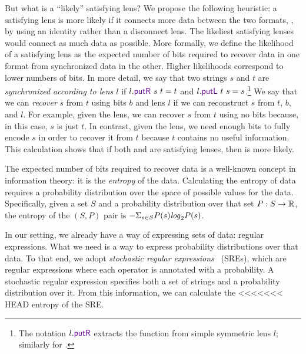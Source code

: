 \documentclass[acmsmall,screen,anonymous]{acmart}
\begin{document}
But what is a ``likely'' satisfying lens? We propose the following
heuristic: a satisfying
lens is more likely if it connects more data between the two
formats, \EG, by using an identity rather than a disconnect lens.  The
likeliest satisfying lenses would connect as much data as
possible. More formally, we define the likelihood of a
satisfying lens as the expected number of bits required to recover
data in one format from synchronized data in the other.  Higher
likelihoods correspond to lower numbers of bits. In more
detail, we say that two strings $s$ and $t$ are \emph{synchronized
according to lens $l$} if $l.\PutR\ s\ t = t$ and $l.\PutL\ t\ s = s$.\footnote{
The notation $l.\PutR$ extracts the \PutR function from simple
symmetric lens $l$; similarly for \PutL.}  We say that we
can \emph{recover} $s$ from $t$ using bits $b$ and lens $l$ if we can
reconstruct $s$ from $t$, $b$, and $l$.  For example, given
the \IdentityLens{} lens, we can recover $s$ from $t$ using no bits
because, in this case, $s$ is just $t$.  In contrast, given
the \Disconnect{} lens, we need enough bits to fully encode $s$ in
order to recover it from $t$ because $t$ contains no useful
information.  This calculation shows that if both \IdentityLens{}
and \Disconnect{} are satisfying lenses, then \IdentityLens{} is more
likely.

The expected number of bits required to recover data is a
well-known concept in information theory: it is the \emph{entropy} of
the data. Calculating the 
entropy of data requires a probability distribution over the
space of possible values for the data.  Specifically,
given a set $S$ and a probability distribution over that set $P
: S \rightarrow \mathbb{R}$, the entropy of the $(S,P)$ pair is $-\Sigma_{s\in
  S}P(s)\mathit{log}_2P(s)$. 

In our setting, we already have a way of expressing sets of data:
regular expressions.  What we need is a way to express probability
distributions over that data.
To that end, we adopt \emph{stochastic regular expressions}~\cite{?} (SREs), 
which are regular expressions where each operator is annotated with a
probability.  A stochastic regular expression
specifies both a set of strings and a probability
distribution over it.  From this information, we can calculate the
<<<<<<< HEAD
entropy of the SRE. 
\end{document}
